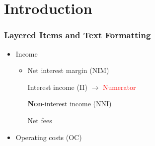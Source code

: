 \documentclass[12pt,aspectratio=169,xcolor=dvipsnames,hyperref={colorlinks=true,linkcolor=blue,citecolor=black}]{beamer}
\begin{document}
\title[]{}
\subtitle[]{Subtitle of the Paper}
\author[]{  \hspace{-1.4ex} \and  \hspace{-1.4ex} }
\date[]{Month Day, Year}
\maketitle
{}


\section[]{Introduction}

\begin{frame}[label=layered]
	\frametitle{Layered Items and Text Formatting}
	\begin{itemize}
		\item Income \quad \cmark
		\begin{itemize}
			\item \alert{Net interest margin} (NIM)
			\begin{itemize}
				\iftoggle{struct}{\item<2->}{\item} Interest income (II) \(\rightarrow\) \textcolor{red}{Numerator}
			\end{itemize}
			\iftoggle{struct}{\item<1->}{\item} \textbf{Non}-interest income (NNI)
			\begin{itemize}
				\iftoggle{long}{\item<2>}{\item} Net fees
			\end{itemize}
		\end{itemize}
		\item Operating costs (OC) \quad \xmark
	\end{itemize}
\end{frame}
\end{document}
